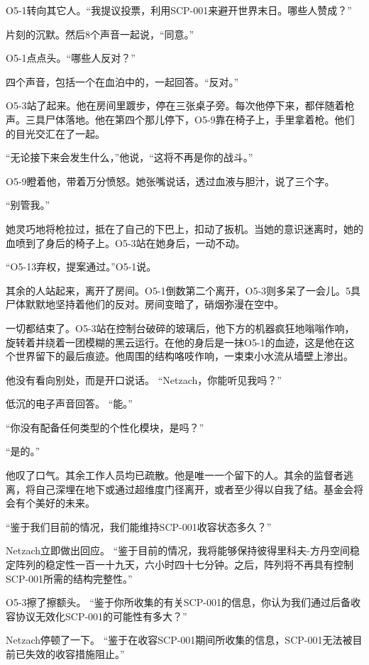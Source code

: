 O5-1转向其它人。“我提议投票，利用SCP-001来避开世界末日。哪些人赞成？”

片刻的沉默。然后8个声音一起说，“同意。”

O5-1点点头。“哪些人反对？”

四个声音，包括一个在血泊中的，一起回答。“反对。”

O5-3站了起来。他在房间里踱步，停在三张桌子旁。每次他停下来，都伴随着枪声。三具尸体落地。他在第四个那儿停下，O5-9靠在椅子上，手里拿着枪。他们的目光交汇在了一起。

“无论接下来会发生什么，”他说，“这将不再是你的战斗。”

O5-9瞪着他，带着万分愤怒。她张嘴说话，透过血液与胆汁，说了三个字。

“别管我。”

她灵巧地将枪拉过，抵在了自己的下巴上，扣动了扳机。当她的意识迷离时，她的血喷到了身后的椅子上。O5-3站在她身后，一动不动。

“O5-13弃权，提案通过。”O5-1说。

其余的人站起来，离开了房间。O5-1倒数第二个离开，O5-3则多呆了一会儿。5具尸体默默地坚持着他们的反对。房间变暗了，硝烟弥漫在空中。

\hr

一切都结束了。O5-3站在控制台破碎的玻璃后，他下方的机器疯狂地嗡嗡作响，旋转着并绕着一团模糊的黑云运行。在他的身后是一抹O5-1的血迹，这是他在这个世界留下的最后痕迹。他周围的结构咯吱作响，一束束小水流从墙壁上渗出。

他没有看向别处，而是开口说话。 “Netzach，你能听见我吗？”

低沉的电子声音回答。 “能。”

“你没有配备任何类型的个性化模块，是吗？”

“是的。”

他叹了口气。其余工作人员均已疏散。他是唯一一个留下的人。其余的监督者逃离，将自己深埋在地下或通过超维度门径离开，或者至少得以自我了结。基金会将会有个美好的未来。

“鉴于我们目前的情况，我们能维持SCP-001收容状态多久？”

Netzach立即做出回应。 
“鉴于目前的情况，我将能够保持彼得里科夫-方丹空间稳定阵列的稳定性一百一十九天，六小时四十七分钟。之后，阵列将不再具有控制SCP-001所需的结构完整性。”

O5-3擦了擦额头。 “鉴于你所收集的有关SCP-001的信息，你认为我们通过后备收容协议无效化SCP-001的可能性有多大？”

Netzach停顿了一下。 “鉴于在收容SCP-001期间所收集的信息，SCP-001无法被目前已失效的收容措施阻止。”

